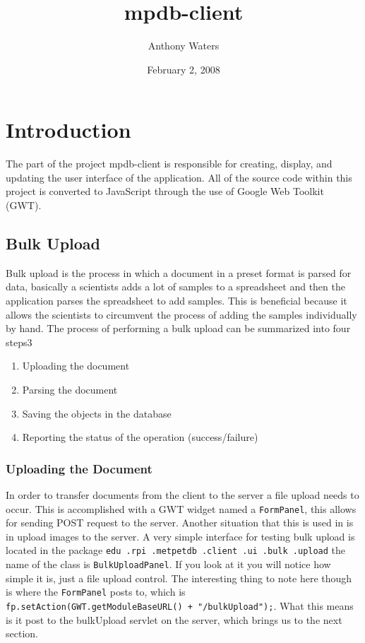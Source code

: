 \documentclass[10pt,letterpaper,onecolumn,oneside]{report}
\begin{document}
\title{mpdb-client}
\author{Anthony Waters}
\date{February 2, 2008}
\maketitle
\tableofcontents
\newpage
\part{Introduction}
The part of the project mpdb-client is responsible for creating, display, and updating the user interface of the application.  All of the source code within this project is converted to JavaScript through the use of Google Web Toolkit (GWT).
\chapter{Bulk Upload}
Bulk upload is the process in which a document in a preset format is parsed for data, basically a scientists adds a lot of samples to a spreadsheet and then the application parses the spreadsheet to add samples.  This is beneficial because it allows the scientists to circumvent the process of adding the samples individually by hand.  The process of performing a bulk upload can be summarized into four steps3
\begin{enumerate}
\item Uploading the document
\item Parsing the document
\item Saving the objects in the database
\item Reporting the status of the operation (success/failure)
\end{enumerate}
\section{Uploading the Document}
In order to transfer documents from the client to the server a file upload needs to occur.  This is accomplished with a GWT widget named a
\texttt{FormPanel}, this allows for sending POST request to the server.  Another situation that this is used in is in upload images to the server.  A very simple interface for testing bulk upload is located in the package 
\texttt{edu\ .rpi\ .metpetdb\ .client\ .ui\ .bulk\ .upload} the name of the class is
\texttt{BulkUploadPanel}.  If you look at it you will notice how simple it is, just a file upload control.  The interesting thing to note here though is where the \texttt{FormPanel} posts to, which is \texttt{fp.setAction(GWT.getModuleBaseURL() + "/bulkUpload");}.  What this means is it post to the bulkUpload servlet on the server, which brings us to the next section.
\end{document}
